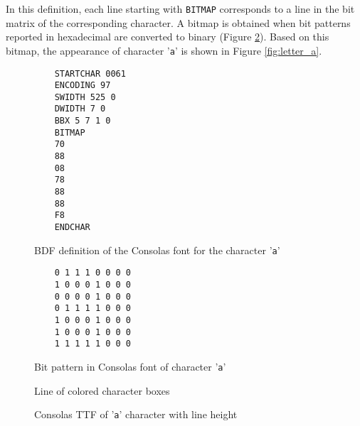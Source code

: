 \documentclass{article}
\begin{document}
In this definition, each line starting with \texttt{BITMAP} corresponds to a line in the bit matrix of the corresponding
character. A bitmap is obtained when bit patterns reported in hexadecimal are converted to binary (Figure
\ref{fig:letter_a_bitmap}). Based on this bitmap, the appearance of character '\texttt{a}' is shown in Figure \ref{fig:letter_a}.

\begin{figure}[htbp]
  \caption{BDF definition of the Consolas font for the character '\texttt{a}'}
  \label{code:letter_a_BDF}

  \centering
  \begin{BVerbatim}
    STARTCHAR 0061
    ENCODING 97
    SWIDTH 525 0
    DWIDTH 7 0
    BBX 5 7 1 0
    BITMAP
    70
    88
    08
    78
    88
    88
    F8
    ENDCHAR
  \end{BVerbatim}
\end{figure}

\begin{figure}[htbp]
  \caption{Bit pattern in Consolas font of character '\texttt{a}'}
  \label{fig:letter_a_bitmap}

  \centering
  \begin{BVerbatim}
    0 1 1 1 0 0 0 0
    1 0 0 0 1 0 0 0
    0 0 0 0 1 0 0 0
    0 1 1 1 1 0 0 0
    1 0 0 0 1 0 0 0
    1 0 0 0 1 0 0 0
    1 1 1 1 1 0 0 0
  \end{BVerbatim}
\end{figure}

\begin{figure}[H]
  \centering
  
  \caption{Line of colored character boxes}
  \label{fig:line}
\end{figure}

\begin{figure}[htbp]
    \centering
    
    \caption{Consolas TTF of '\texttt{a}' character with line height}
    \label{fig:charbox}
\end{figure}

\def\pixelmap_a{{%
  {0,0,0,0,0,0,0,0,0,0,0},
  {0,0,0,0,0,0,0,0,0,0,0},
  {0,0,0,0,0,0,0,0,0,0,0},
  {0,0,0,0,0,0,0,0,0,0,0},
  {0,0,0,0,0,0,0,0,0,0,0},
  {0,0,0,0,0,0,0,0,0,0,0},
  {0,0,0,0,0,0,0,0,0,0,0},
  {0,1,1,1,1,1,0,0,0,0,0},
  {0,1,0,0,0,1,0,0,0,0,0},
  {0,1,0,0,0,1,0,0,0,0,0},
  {0,0,1,1,1,1,0,0,0,0,0},
  {0,0,0,0,0,1,0,0,0,0,0},
  {0,1,0,0,0,1,0,0,0,0,0},
  {0,0,1,1,1,0,0,0,0,0,0},
  {0,0,0,0,0,0,0,0,0,0,0},
  {0,0,0,0,0,0,0,0,0,0,0},
  {0,0,0,0,0,0,0,0,0,0,0},
  {0,0,0,0,0,0,0,0,0,0,0},
  {0,0,0,0,0,0,0,0,0,0,0},
  {0,0,0,0,0,0,0,0,0,0,0},
  {0,0,0,0,0,0,0,0,0,0,0},
  {0,0,0,0,0,0,0,0,0,0,0},
}}
\end{document}
